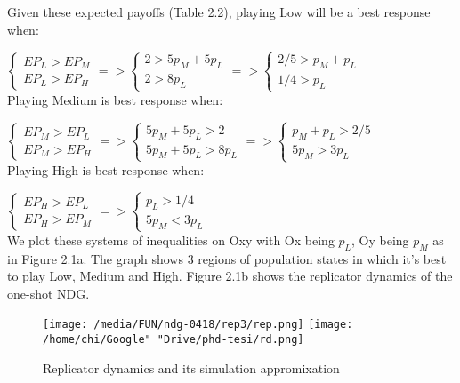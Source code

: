 \documentclass[12.5pt]{report}
\begin{document}
Given these expected payoffs (Table 2.2), playing Low will be a best response when:

$
\begin{cases} 
EP_L > EP_M \\ 
EP_L > EP_H 
\end{cases}
=>
\begin{cases}
2 > 5p_M + 5p_L \\
2 > 8p_L 
\end{cases}
=> 
\begin{cases}
2/5 >p_M + p_L \\
1/4 > p_L
\end{cases}
$\\

Playing Medium is best response when:

$
\begin{cases}
EP_M > EP_L\\
EP_M > EP_H 
\end{cases}
=>
\begin{cases}
5p_M+5p_L>2\\
5p_M+5p_L > 8p_L 
\end{cases}
=> 
\begin{cases}
p_M+p_L>2/5\\
5p_M>3p_L
\end{cases}
$\\

Playing High is best response when:

$
\begin{cases}
EP_H > EP_L\\
EP_H > EP_M 
\end{cases}
=>
\begin{cases}
p_L>1/4\\
5p_M < 3p_L 
\end{cases}
$\\

We plot these systems of inequalities on Oxy with Ox being $p_L$, Oy being $p_M$ as in Figure 2.1a. The graph shows 3 regions of population states in which it's best to play Low, Medium and High. Figure 2.1b shows the replicator dynamics of the one-shot NDG.

\begin{figure}
\texttt{[image: /media/FUN/ndg-0418/rep3/rep.png]}
\texttt{[image: /home/chi/Google" "Drive/phd-tesi/rd.png]}
\caption{Replicator dynamics and its simulation appromixation}
\end{figure}
\end{document}
